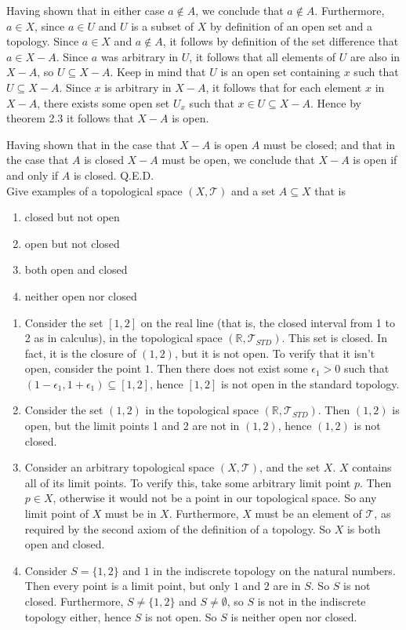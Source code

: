 \documentclass{article}
\theoremstyle{definition}
\newcommand{\standtop}{\mathcal{T}_{STD}}
\newcommand{\topT}{\mathcal{T}}
\newcommand{\R}{\mathbb{R}}
\begin{document}
\begin{itemize}
\begin{itemize}
    \end{itemize}
    Having shown that in either case $a\not\in A$, we conclude that $a\not\in A$. Furthermore, $a\in X$, since $a\in U$ and $U$ is a subset of $X$ by definition of an open set and a topology. Since $a\in X$ and $a\not \in A$, it follows by definition of the set difference that $a\in X-A$. Since $a$ was arbitrary in $U$, it follows that all elements of $U$ are also in $X-A$, so $U\subseteq X-A$. Keep in mind that $U$ is an open set containing $x$ such that $U\subseteq X-A$. Since $x$ is arbitrary in $X-A$, it follows that for each element $x$ in $X-A$, there exists some open set $U_x$ such that $x\in U \subseteq X-A$. Hence by theorem 2.3 it follows that $X-A$ is open.
\end{itemize}
Having shown that in the case that $X-A$ is open $A$ must be closed; and that in the case that $A $ is closed $X-A$ must be open, we conclude that $X-A$ is open if and only if $A$ is closed. Q.E.D.\\




 Give examples of a topological space $(X,\topT)$ and a set $A\subseteq X$ that is
\begin{enumerate}
    \item closed but not open
    \item open but not closed
    \item both open and closed
    \item neither open nor closed
\end{enumerate}

\begin{enumerate}
    \item Consider the set $[1,2]$ on the real line (that is, the closed interval from 1 to 2 as in calculus), in the topological space $(\R, \standtop)$. This set is closed. In fact, it is the closure of $(1,2)$, but it is not open. To verify that it isn't open, consider the point $1$. Then there does not exist some $\epsilon_1 > 0$ such that $(1- \epsilon_1, 1 + \epsilon_1)\subseteq [1,2]$, hence $[1,2]$ is not open in the standard topology.
    \item Consider the set $(1,2)$ in the topological space $(\R,\standtop)$. Then $(1,2)$ is open, but the limit points 1 and 2 are not in $(1,2)$, hence $(1,2)$ is not closed.
    \item Consider an arbitrary topological space $(X,\topT)$, and the set $X$. $X$ contains all of its limit points. To verify this, take some arbitrary limit point $p$. Then $p\in X$, otherwise it would not be a point in our topological space. So any limit point of $X$ must be in $X$. Furthermore, $X$ must be an element of $\topT$, as required by the second axiom of the definition of a topology. So $X$ is both open and closed.
    \item Consider $S = \{1,2\}$ and $1$ in the indiscrete topology on the natural numbers. Then every point is a limit point, but only $1$ and $2$ are in $S$. So $S$ is not closed. Furthermore, $S \ne \{1,2\}$ and $S\ne \emptyset$, so $S$ is not in the indiscrete topology either, hence $S$ is not open. So $S$ is neither open nor closed.
\end{enumerate}
\end{document}
